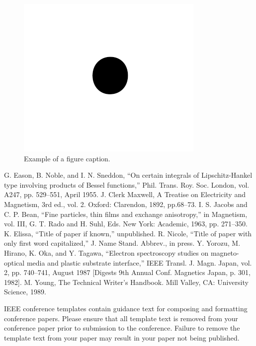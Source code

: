 \documentclass[conference]{IEEEtran}
\begin{document}
    \begin{figure}[htbp]
        \centerline{\includegraphics{fig1.png}}
        \caption{Example of a figure caption.}
        \label{fig}
    \end{figure}


    \begin{thebibliography}{00}
         G. Eason, B. Noble, and I. N. Sneddon, ``On certain integrals of Lipschitz-Hankel type involving products of Bessel functions,'' Phil. Trans. Roy. Soc. London, vol. A247, pp. 529--551, April 1955.
         J. Clerk Maxwell, A Treatise on Electricity and Magnetism, 3rd ed., vol. 2. Oxford: Clarendon, 1892, pp.68--73.
         I. S. Jacobs and C. P. Bean, ``Fine particles, thin films and exchange anisotropy,'' in Magnetism, vol. III, G. T. Rado and H. Suhl, Eds. New York: Academic, 1963, pp. 271--350.
         K. Elissa, ``Title of paper if known,'' unpublished.
         R. Nicole, ``Title of paper with only first word capitalized,'' J. Name Stand. Abbrev., in press.
         Y. Yorozu, M. Hirano, K. Oka, and Y. Tagawa, ``Electron spectroscopy studies on magneto-optical media and plastic substrate interface,'' IEEE Transl. J. Magn. Japan, vol. 2, pp. 740--741, August 1987 [Digests 9th Annual Conf. Magnetics Japan, p. 301, 1982].
         M. Young, The Technical Writer's Handbook. Mill Valley, CA: University Science, 1989.
    \end{thebibliography}
    \vspace{12pt}
    \color{red}
    IEEE conference templates contain guidance text for composing and formatting conference papers. Please ensure that all template text is removed from your conference paper prior to submission to the conference. Failure to remove the template text from your paper may result in your paper not being published.
\end{document}

